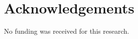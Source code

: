 \documentclass[twoside,twocolumn,9pt]{extarticle}
\renewcommand{\refname}{Notes and references}
\begin{document}
\section*{Acknowledgements}

No funding was received for this research.

\makeatletter
\if@firstcolumn
  \balance
\else
\fi
\makeatother

\renewcommand\refname{Notes and references}



\end{document}
